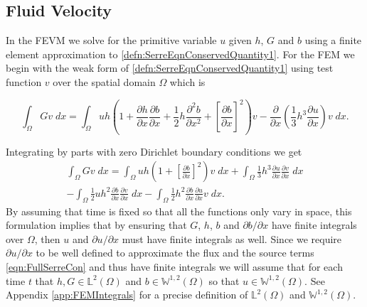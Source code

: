 \subsection{Fluid Velocity}
\label{subsec:FluidVelocity}
In the FEVM we solve for the primitive variable $u$ given $h$, $G$ and $b$ using a finite element approximation to \eqref{defn:SerreEqnConservedQuantity1}. For the FEM we begin with the weak form of \eqref{defn:SerreEqnConservedQuantity1} using test function $v$ over the spatial domain $\Omega$ which is 

\begin{equation*}
	\int_{\Omega } G v \; dx =  \int_{\Omega } uh \left(1 + \frac{\partial h}{\partial x}\frac{\partial b}{\partial x} + \frac{1}{2}h\frac{\partial^2 b}{\partial x^2} +  \left[\frac{\partial b}{\partial x}\right]^2 \right) v - \frac{\partial}{\partial x}\left(\frac{1}{3}h^3  \frac{\partial {u}}{\partial x}\right) v \; dx.
\end{equation*}

Integrating by parts with zero Dirichlet boundary conditions we get
\begin{multline}
\int_{\Omega } G v \; dx = \int_{\Omega } uh \left(1 + \left[\frac{\partial b}{\partial x}\right]^2 \right) v \; dx +  \int_{\Omega } \frac{1}{3}h^3  \frac{\partial {u}}{\partial x} \frac{\partial v}{\partial x} \; dx  \\ - 
\int_{\Omega }   \frac{1}{2} u h^2\frac{\partial b}{\partial x}  \frac{\partial v }{\partial x}\; dx - 
\int_{\Omega }   \frac{1}{2}h^2\frac{\partial b}{\partial x}  \frac{\partial u }{\partial x}v \; dx.
\label{eqn:WeakFormDomain}
\end{multline}
By assuming that time is fixed so that all the functions only vary in space, this formulation implies that by ensuring that $G$, $h$, $b$ and $\partial b / \partial x$ have finite integrals over $\Omega$, then $u$ and $\partial u / \partial x$ must have finite integrals as well. Since we require $\partial u / \partial x$ to be well defined to approximate the flux and the source terms \eqref{eqn:FullSerreCon} and thus have finite integrals we will assume that for each time $t$ that $h,G \in \mathbb{L}^2(\Omega)$ and $b \in\mathbb{W}^{1,2}(\Omega)$ so that $u \in \mathbb{W}^{1,2}(\Omega)$. See Appendix \ref{app:FEMIntegrals} for a precise definition of $\mathbb{L}^2(\Omega)$ and $\mathbb{W}^{1,2}(\Omega)$.

